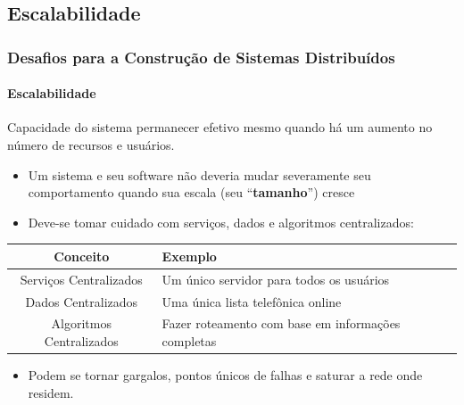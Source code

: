 \documentclass[hyperref={pdfpagelabels=false},table]{beamer}
\begin{document}
\subsection{Escalabilidade}
\begin{frame}
    \frametitle{Desafios para a Construção de Sistemas Distribuídos}
    \framesubtitle{Escalabilidade}
    \begin{block}{}
	   Capacidade do sistema permanecer efetivo mesmo quando há um aumento no número de recursos e usuários.
    \end{block}	
    \begin{itemize}
	\item Um sistema e seu software não deveria mudar severamente seu comportamento quando sua escala (seu ``\textbf{tamanho}'') cresce
	\item Deve-se tomar cuidado com serviços, dados e algoritmos centralizados:
    \end{itemize}

    \begin{center}
      \begin{tabular}{cp{7cm}} \hline
		Conceito & Exemplo \\ \hline \hline
		Serviços Centralizados & Um único servidor para todos os usuários \\
		Dados Centralizados & Uma única lista telefônica online  \\
		Algoritmos Centralizados & Fazer roteamento com base em informações completas\\
		\hline
      \end{tabular}
    \end{center}
    
    \begin{itemize}
	\item Podem se tornar gargalos, pontos únicos de falhas e saturar a rede onde residem.
    \end{itemize}
\end{frame}
\end{document}

